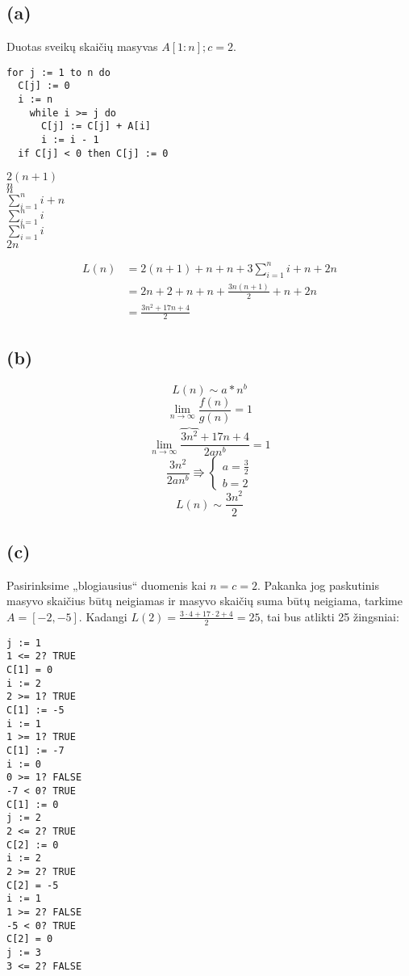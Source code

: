 \documentclass[a4paper,lithuanian]{article}
\begin{document}
\subsection*{(a)}
Duotas sveikų skaičių masyvas $A[1 : n]; c = 2$.
\begin{multicols}{2}
  \begin{lstlisting}
for j := 1 to n do
  C[j] := 0
  i := n
    while i >= j do
      C[j] := C[j] + A[i]
      i := i - 1
  if C[j] < 0 then C[j] := 0
  \end{lstlisting}
  \columnbreak
  $2(n+1)$\\
  $n$\\
  $n$\\
  $\sum_{i=1}^{n}i + n$\\
  $\sum_{i=1}^{n}i$\\
  $\sum_{i=1}^{n}i$\\
  $2n$\\
\end{multicols}
\begin{equation}
  \begin{aligned}
    L(n)&=2(n+1)+n+n+3\sum_{i=1}^{n}i+n+2n\\
        &=2n + 2 + n + n  + \frac{3n(n+1)}{2} + n + 2n\\
        &=\frac{3n^2+17n+4}{2}
  \end{aligned}
\end{equation}
\subsection*{(b)}
\begin{equation}
L(n)\sim{}a*n^b
\end{equation}
\begin{equation}
  \lim_{n\rightarrow\infty{}}\frac{f(n)}{g(n)}=1
\end{equation}
\begin{equation}
  \lim_{n\rightarrow\infty{}}\frac{\overbrace{3n^2}^{}+17n+4}{2an^b}=1
\end{equation}
\begin{equation}
  \frac{3n^2}{2an^b} \Rrightarrow{} \begin{cases} a = \frac{3}{2} \\ b = 2  \end{cases}
\end{equation}
\begin{equation}
L(n)\sim{}\frac{3n^2}{2}
\end{equation}
\subsection*{(c)}
Pasirinksime „blogiausius“ duomenis kai $n = c = 2$. Pakanka jog paskutinis masyvo skaičius būtų neigiamas ir masyvo skaičių suma būtų neigiama, tarkime $A = [-2, -5]$.
Kadangi $L(2) = \frac{3\cdot{4}+17\cdot{2}+4}{2}=25$, tai bus atlikti 25 žingsniai:
\begin{lstlisting}
j := 1
1 <= 2? TRUE
C[1] = 0
i := 2
2 >= 1? TRUE
C[1] := -5
i := 1
1 >= 1? TRUE
C[1] := -7
i := 0
0 >= 1? FALSE
-7 < 0? TRUE
C[1] := 0
j := 2
2 <= 2? TRUE
C[2] := 0
i := 2
2 >= 2? TRUE
C[2] = -5
i := 1
1 >= 2? FALSE
-5 < 0? TRUE
C[2] = 0
j := 3
3 <= 2? FALSE
\end{lstlisting}
\end{document}
